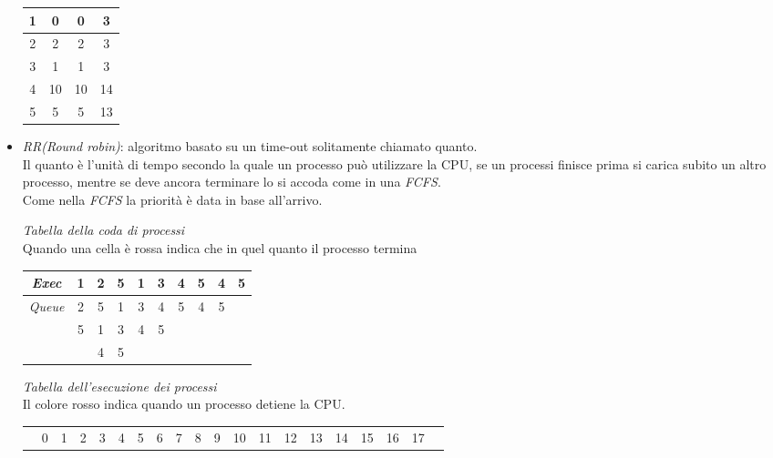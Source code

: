 \documentclass{article}
\begin{document}
\begin{itemize}
\begin{center}
\begin{tabular}{|c|c|c|c|}
               \hline
               1 & 0 & 0 & 3\\
               \hline
               2 & 2 & 2 & 3\\
               \hline
               3 & 1 & 1 &3\\
               \hline
               4 & 10 & 10 & 14\\
               \hline
               5 & 5 & 5 & 13\\
               \hline
            \end{tabular}
         \end{center}
      \item \emph{RR(Round robin)}: algoritmo basato su un time-out solitamente chiamato quanto.\\
         Il quanto è l'unità di tempo secondo la quale un processo può utilizzare la CPU, se un processi finisce prima si carica subito un altro processo, mentre se deve ancora terminare lo si accoda come in una \emph{FCFS}.\\
         Come nella \emph{FCFS} la priorità è data in base all'arrivo.
         \begin{center}
            \emph{Tabella della coda di processi}\\
            Quando una cella è rossa indica che in quel quanto il processo termina\\
            \begin{tabular}{|c|c|c|c|c|c|c|c|c|c|}
               \hline
               \emph{Exec} & 1 & \cellcolor{red!25} 2 & 5 & \cellcolor{red!25} 1 & \cellcolor{red!25} 3 & 4 & 5 & \cellcolor{red!25} 4 & \cellcolor{red!25} 5\\
               \hline
               \emph{Queue} & 2 & 5 & 1 & 3 & 4 & 5 & 4 & 5 &\\
               & 5 & 1 & 3 & 4 & 5 & & & &\\
               & & 4 & 5 & & & & & &\\
               \hline
            \end{tabular}
         \end{center}
         \begin{center}
            \emph{Tabella dell'esecuzione dei processi}\\
            Il colore rosso indica quando un processo detiene la CPU.
            \begin{tabular}{|c|c|c|c|c|c|c|c|c|c|c|c|c|c|c|c|c|c|c|c|}
                \hline
                & 0 & 1 & 2 & 3 & 4 & 5 & 6 & 7 & 8 & 9 & 10 & 11 & 12 & 13 & 14 & 15 & 16 & 17\\

\end{tabular}
\end{center}
\end{itemize}
\end{document}
